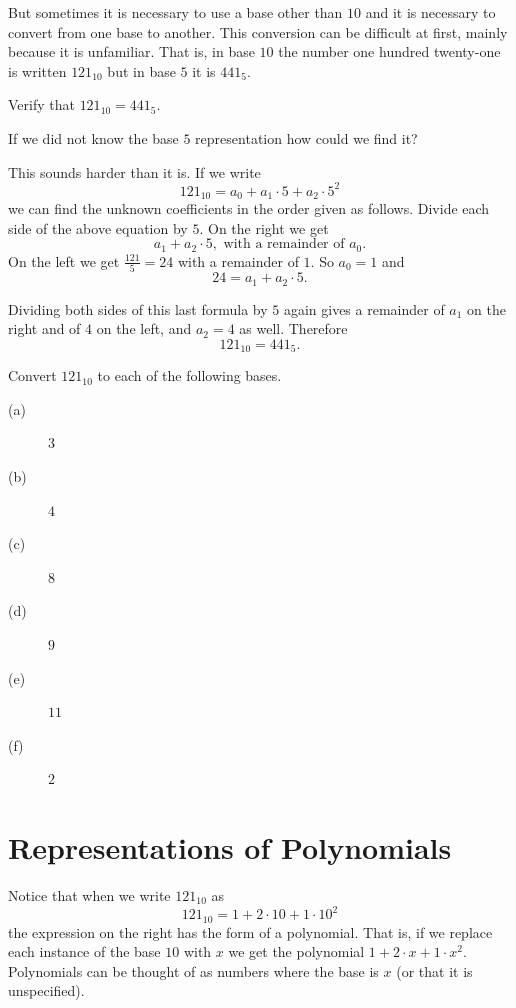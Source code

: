 But sometimes it is necessary to use a base other than $10$ and it is
necessary to convert from one base to another. This conversion can be
difficult at first, mainly because it is unfamiliar. That is, in base
$10$ the number one hundred twenty-one is written $121_{10}$ but in
base $5$ it is $441_5.$

\begin{embeddedproblem}{}
  Verify that $121_{10} = 441_5.$
\end{embeddedproblem}

If we did not know the base $5$ representation how could we find it?

This sounds harder than it is. If we write  
$$
121_{10} = a_0 +a_1\cdot5 + a_2\cdot5^2
$$ 
we can find the unknown coefficients in the
order given as follows. Divide each side of the above equation by $5.$
On the right we get 
$$
a_1+a_2\cdot5, \text{ with a remainder of $a_0$.}
$$
On the left we get $\frac{121}{5} = 24$ with a remainder of $1.$ So
$a_0 = 1$ and 
$$
24 = a_1+a_2\cdot5.
$$ 

Dividing both sides of this last formula by $5$ again gives a
remainder of $a_1$ on the right and of $4$ on the left, and $a_2=4$ as
well. Therefore
$$
121_{10} = 441_5.
$$
\begin{embeddedproblem}{}
  Convert $121_{10}$ to each of the following bases.
  \begin{multicols}{3}
    \begin{description}
    \item[(a)] $3$
    \item[(b)] $4$
    \item[(c)] $8$
    \item[(d)] $9$
    \item[(e)] $11$
    \item[(f)] $2$
    \end{description}
  \end{multicols}
\end{embeddedproblem}

\section{Representations of Polynomials}
\label{sec:repr-polyn}

Notice that when we write $121_{10}$ as 
$$
121_{10} = 1+2\cdot10+1\cdot10^2
$$
the expression on the right has the form of a polynomial. That is, if
we replace each instance of the base $10$ with $x$ we get the polynomial
$1+2\cdot x+1\cdot x^2.$ Polynomials can be thought of as numbers
where the base is $x$ (or that it is unspecified).

